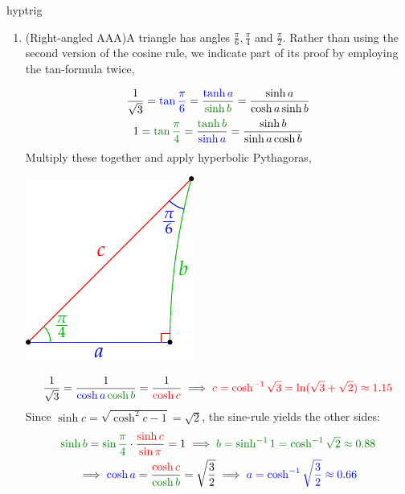\begin{examples}{}{hyptrig}
\begin{enumerate}
	 	\item\label{ex:rtangleaaa} (Right-angled AAA)\lstsp A triangle has angles $\frac\pi 6,\frac\pi 4$ and $\frac\pi 2$. Rather than using the second version of the cosine rule, we indicate part of its proof by employing the tan-formula twice,\par
	  \begin{minipage}[t]{0.71\linewidth}\vspace{-12pt}
		  \begin{gather*}
		  	\frac 1{\sqrt 3} =\textcolor{blue}{\tan\frac\pi 6} =\frac{\textcolor{blue}{\tanh a}}{\textcolor{Green}{\sinh b}}=\frac{\sinh a}{\cosh a\sinh b}\\
		  	1=\textcolor{Green}{\tan\frac\pi 4}=\frac{\textcolor{Green}{\tanh b}}{\textcolor{blue}{\sinh a}}=\frac{\sinh b}{\sinh a\cosh b}
		  \end{gather*}
		  Multiply these together and apply hyperbolic Pythagoras,
	  \end{minipage}
	  \hfill
	  \begin{minipage}[t]{0.28\linewidth}\vspace{-20pt}
	  	\flushright\includegraphics[scale=0.95]{isom-right2}
	  \end{minipage}\par\vspace{-12pt}
	  \[
	  	\frac 1{\sqrt 3}=\frac 1{\textcolor{blue}{\cosh a}\,\textcolor{Green}{\cosh b}}=\frac 1{\textcolor{red}{\cosh c}}\implies \textcolor{red}{c=\cosh^{-1}\sqrt 3=\ln(\sqrt 3+\sqrt 2)\approx 1.15}
	  \]
	  Since $\sinh c=\sqrt{\cosh^2c-1}=\sqrt 2$, the sine-rule yields the other sides:
	  \begin{gather*}
		  \textcolor{Green}{\sinh b} =\textcolor{Green}{\sin\frac\pi 4}\cdot\frac{\textcolor{red}{\sinh c}}{\textcolor{red}{\sin\pi}} =1 \implies \textcolor{Green}{b=\sinh^{-1} 1 =\cosh^{-1}\sqrt 2\approx 0.88}\\
		  \implies \textcolor{blue}{\cosh a} =\frac{\textcolor{red}{\cosh c}}{\textcolor{Green}{\cosh b}}=\sqrt{\frac 32} \implies \textcolor{blue}{a=\cosh^{-1}\sqrt{\frac 32}\approx 0.66}
	  \end{gather*}
	  

\end{enumerate}
\end{examples}

